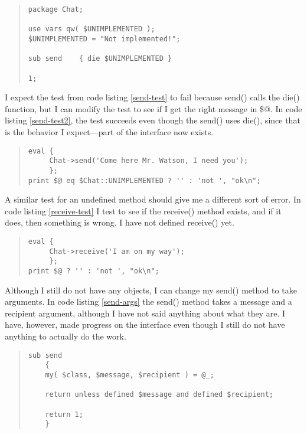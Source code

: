 \begin{quote}
\begin{verbatim}
package Chat;

use vars qw( $UNIMPLEMENTED );
$UNIMPLEMENTED = "Not implemented!";

sub send    { die $UNIMPLEMENTED }

1;
\end{verbatim}
\end{quote}


I expect the test from code listing \ref{send-test} to fail because
send() calls the die() function, but I can modify the test to see if I
get the right message in \$@.  In code listing \ref{send-test2}, the
test succeeds even though the send() uses die(), since that is the
behavior I expect---part of the interface now exists.

\begin{quote}
\begin{verbatim}
eval {
     Chat->send('Come here Mr. Watson, I need you');
     };
print $@ eq $Chat::UNIMPLEMENTED ? '' : 'not ', "ok\n";
\end{verbatim}
\end{quote}


A similar test for an undefined method should give me a different
sort of error.  In code listing \ref{receive-test} I test to see if 
the receive() method exists, and if it does, then something is
wrong.  I have not defined receive() yet.

\begin{quote}
\begin{verbatim}
eval {
     Chat->receive('I am on my way');
     };
print $@ ? '' : 'not ', "ok\n";
\end{verbatim}
\end{quote}

Although I still do not have any objects, I can change my send()
method to take arguments.  In code listing \ref{send-args} the send()
method takes a message and a recipient argument, although I have
not said anything about what they are.  I have, however, made 
progress on the interface even though I still do not have anything
to actually do the work.

\begin{quote}
\begin{verbatim}
sub send
	{
	my( $class, $message, $recipient ) = @_;
	
	return unless defined $message and defined $recipient;
	
	return 1;
	}
\end{verbatim}
\end{quote}

